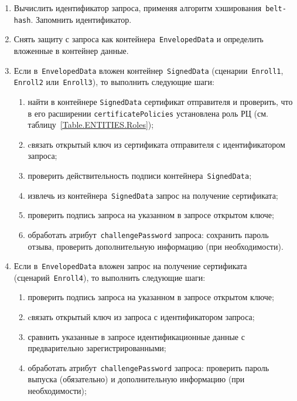 \begin{enumerate}
\item
Вычислить идентификатор запроса, применяя 
алгоритм хэширования~\texttt{belt-hash}. 
Запомнить идентификатор.

\item
Снять защиту с запроса как контейнера~\texttt{EnvelopedData} 
и определить вложенные в контейнер данные.

\item
Если в~\texttt{EnvelopedData} вложен контейнер~\texttt{SignedData}
(сценарии~\texttt{Enroll1}, \texttt{Enroll2} или~\texttt{Enroll3}), 
то выполнить следующие шаги:

\begin{enumerate}
\item
найти в контейнере \texttt{SignedData} сертификат отправителя
и проверить, что в его расширении \texttt{certificatePolicies} 
установлена роль РЦ (см. таблицу~\ref{Table.ENTITIES.Roles});
\item
cвязать открытый ключ из сертификата отправителя с идентификатором 
запроса;
\item
проверить действительность подписи контейнера~\texttt{SignedData};
\item
извлечь из контейнера~\texttt{SignedData} запрос на получение сертификата;
\item
проверить подпись запроса на указанном в запросе открытом ключе;
\item
обработать атрибут~\texttt{challengePassword} запроса:
сохранить пароль отзыва, проверить дополнительную информацию
(при необходимости).
\end{enumerate}

\item
Если в~\texttt{EnvelopedData} вложен запрос на получение сертификата
(сценарий~\texttt{Enroll4}), то выполнить следующие шаги:
\begin{enumerate}
\item
проверить подпись запроса на указанном в запросе открытом ключе;
\item
cвязать открытый ключ из запроса с идентификатором запроса;
\item
сравнить указанные в запросе идентификационные данные с предварительно
зарегистрированными;
\item
обработать атрибут~\texttt{challengePassword} запроса:
проверить пароль выпуска (обязательно) и  
дополнительную информацию (при необходимости);
\end{enumerate}


\end{enumerate}

